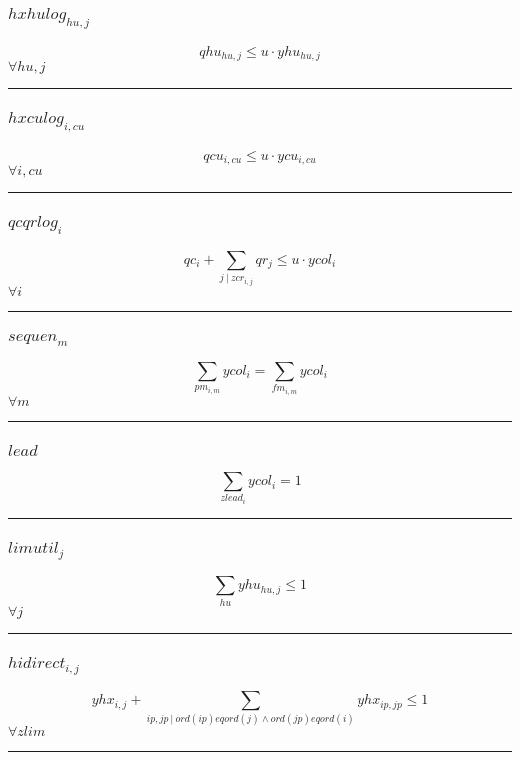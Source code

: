 \documentclass[11pt]{article}
\begin{document}
\subsubsection*{$hxhulog_{hu,j}$}
\begin{equation}
qhu_{hu,j} \leq u \cdot yhu_{hu,j}
\end{equation}
\hfill
$
\forall hu,j
$\vspace{5pt}
\hrule
\subsubsection*{$hxculog_{i,cu}$}
\begin{equation}
qcu_{i,cu} \leq u \cdot ycu_{i,cu}
\end{equation}
\hfill
$
\forall i,cu
$\vspace{5pt}
\hrule
\subsubsection*{$qcqrlog_{i}$}
\begin{equation}
qc_{i} + \sum_{j ~ | ~ zcr_{i,j}} qr_{j} \leq u \cdot ycol_{i}
\end{equation}
\hfill
$
\forall i
$\vspace{5pt}
\hrule
\subsubsection*{$sequen_{m}$}
\begin{equation}
\sum_{pm_{i,m}} ycol_{i} = \sum_{fm_{i,m}} ycol_{i}
\end{equation}
\hfill
$
\forall m
$\vspace{5pt}
\hrule
\subsubsection*{$lead$}
\begin{equation}
\sum_{zlead_{i}} ycol_{i} = 1
\end{equation}
\vspace{5pt}
\hrule
\subsubsection*{$limutil_{j}$}
\begin{equation}
\sum_{hu} yhu_{hu,j} \leq 1
\end{equation}
\hfill
$
\forall j
$\vspace{5pt}
\hrule
\subsubsection*{$hidirect_{i,j}$}
\begin{equation}
yhx_{i,j} + \sum_{ip,jp ~ | ~ ord(ip) eq ord(j) \wedge ord(jp) eq ord(i)} yhx_{ip,jp} \leq 1
\end{equation}
\hfill
$
\forall zlim
$\vspace{5pt}
\hrule
\end{document}
